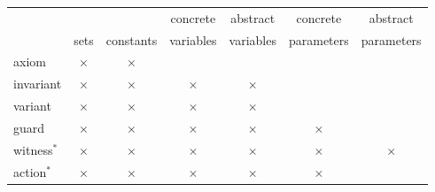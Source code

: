 \begin{center}
  \newcommand{\markcell}{$\times$}
  \begin{tabular}{lcccccc}
  \hline
            &           &           & concrete  & abstract  & concrete   & abstract \\
            & sets      & constants & variables & variables & parameters & parameters \\
  \hline
  axiom     & \markcell & \markcell &           &           &            & \\
  invariant & \markcell & \markcell & \markcell & \markcell &            & \\
  variant   & \markcell & \markcell & \markcell & \markcell &            & \\
  guard     & \markcell & \markcell & \markcell & \markcell & \markcell  & \\
  witness$^{*}$   & \markcell & \markcell & \markcell & \markcell & \markcell  & \markcell \\
  action$^{*}$    & \markcell & \markcell & \markcell & \markcell & \markcell  &  \\
  \hline
  \end{tabular}    
\end{center}


